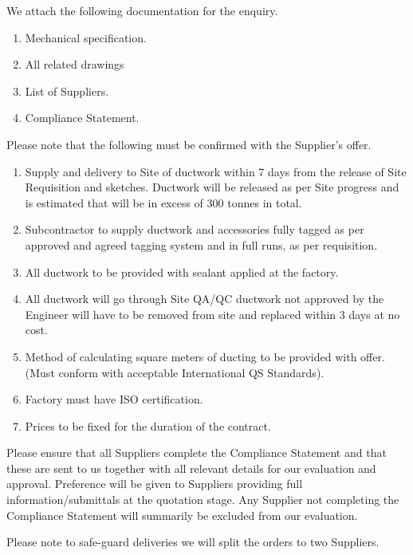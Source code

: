 \documentclass[a4paper,12pt,oneside]{article}
\begin{document}
\begin{mcdletter}

We attach the following documentation for the enquiry.

\begin{enumerate}    
\item Mechanical specification.
\item All related drawings
\item List of Suppliers.
\item Compliance Statement.
\end{enumerate}

Please note that the following must be confirmed  with the Supplier's offer.

\begin{enumerate}
\item Supply and delivery to Site of ductwork within 7 days from the release of Site Requisition and sketches. Ductwork will be released as per Site progress and is estimated that will be in excess of 300 tonnes in total.

\item Subcontractor to supply ductwork and accessories fully tagged as per approved and agreed tagging system and in full runs, as per requisition.

\item All ductwork to be provided with sealant applied at the factory.

\item All ductwork will go through Site QA/QC ductwork not approved by the Engineer will have to be removed from site and replaced within 3 days at no cost.

\item Method of calculating square meters of ducting to be provided with offer. (Must conform with acceptable International QS Standards).

\item Factory must have ISO certification.

\item Prices to be fixed for the duration of the contract.

\end{enumerate}

Please ensure that all Suppliers complete the Compliance Statement and that these are sent to us together with all relevant details for our evaluation and approval. Preference will be given to Suppliers providing full information/submittals at the quotation stage. Any Supplier not completing the Compliance Statement will summarily be excluded from our evaluation.

Please note to safe-guard deliveries we will split the orders to  two Suppliers.
\end{mcdletter}
\end{document}
